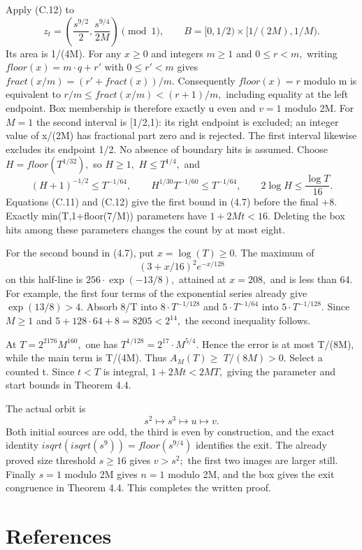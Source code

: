 \documentclass[11pt,a4paper]{article}
\begin{document}
Apply (C.12) to \[
z_t=\left(\frac{s^{9/2}}2,\frac{s^{9/4}}{2M}\right)\pmod1,
\qquad B=[0,1/2)\mathbin{\times}[1/(2M),1/M).
\] Its area is 1/(4M). For any \(x\ge 0\) and integers \(m\ge 1\) and
\(0\le r<m,\) writing \(floor(x)=m\cdot q+r'\) with \(0\le r'<m\) gives
\(fract(x/m)=(r'+fract(x))/m.\) Consequently \(floor(x)=r\) modulo m is
equivalent to \(r/m\le fract(x/m)<(r+1)/m,\) including equality at the
left endpoint. Box membership is therefore exactly u even and \(v=1\)
modulo 2M. For \(M=1\) the second interval is {[}1/2,1): its right
endpoint is excluded; an integer value of x/(2M) has fractional part
zero and is rejected. The first interval likewise excludes its endpoint
1/2. No absence of boundary hits is assumed. Choose
\(H=floor(T^{1/32}),\) so \(H\ge 1,\) \(H\le T^{1/4},\) and \[
(H+1)^{-1/2}\le T^{-1/64},\qquad
H^{1/30}T^{-1/60}\le T^{-1/64},\qquad
2\log H\le\frac{\log T}{16}.
\] Equations (C.11) and (C.12) give the first bound in (4.7) before the
final +8. Exactly min(T,1+floor(7/M)) parameters have \(1+2Mt<16.\)
Deleting the box hits among these parameters changes the count by at
most eight.

For the second bound in (4.7), put \(x=\log(T)\ge 0.\) The maximum of \[
(3+x/16)^2e^{-x/128}
\] on this half-line is \(256\cdot \exp(-13/8),\) attained at \(x=208,\)
and is less than 64. For example, the first four terms of the
exponential series already give \(\exp(13/8)>4.\) Absorb 8/T into
\(8\cdot T^{-1/128}\) and \(5\cdot T^{-1/64}\) into
\(5\cdot T^{-1/128}.\) Since \(M\ge 1\) and
\(5+128\cdot 64+8=8205<2^14,\) the second inequality follows.

At \(T=2^{2176}M^{160},\) one has \(T^{1/128}=2^17\cdot M^{5/4}.\) Hence
the error is at most T/(8M), while the main term is T/(4M). Thus
\(A_M(T)\ge\) \(T/(8M)>0.\) Select a counted t. Since \(t<T\) is
integral, \(1+2Mt<2MT,\) giving the parameter and start bounds in
Theorem 4.4.

The actual orbit is \[
s^2\longmapsto s^3\longmapsto u\longmapsto v.
\] Both initial sources are odd, the third is even by construction, and
the exact identity \(isqrt(isqrt(s^9))=floor(s^{9/4})\) identifies the
exit. The already proved size threshold \(s\ge 16\) gives \(v>s^2;\) the
first two images are larger still. Finally \(s=1\) modulo 2M gives
\(n=1\) modulo 2M, and the box gives the exit congruence in Theorem 4.4.
This completes the written proof.

\clearpage

\section{References}\label{references}
\end{document}
